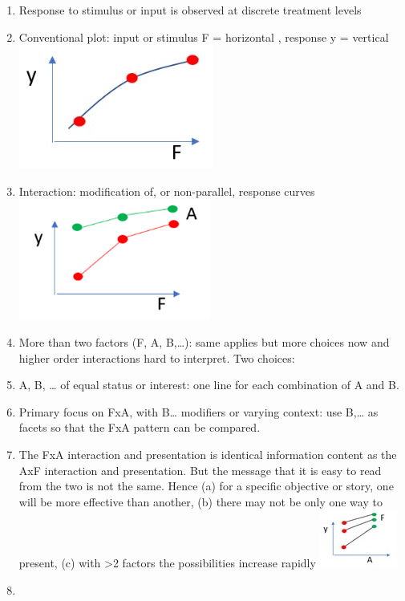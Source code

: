 \documentclass[
]{book}
\providecommand{\tightlist}{%
  \setlength{\itemsep}{0pt}\setlength{\parskip}{0pt}}
\begin{document}
\begin{enumerate}
\def\labelenumi{\arabic{enumi}.}
\tightlist
\item
  Response to stimulus or input is observed at discrete treatment levels
\item
  Conventional plot: input or stimulus F = horizontal , response y = vertical
  \includegraphics{img/Picture1.jpg}
\item
  Interaction: modification of, or non-parallel, response curves
  \includegraphics{img/Picture2.png}
\item
  More than two factors (F, A, B,\ldots): same applies but more choices now and higher order interactions hard to interpret. Two choices:
\item
  A, B, \ldots{} of equal status or interest: one line for each combination of A and B.
\item
  Primary focus on FxA, with B\ldots{} modifiers or varying context: use B,\ldots{} as facets so that the FxA pattern can be compared.
\item
  The FxA interaction and presentation is identical information content as the AxF interaction and presentation. But the message that it is easy to read from the two is not the same. Hence (a) for a specific objective or story, one will be more effective than another, (b) there may not be only one way to present, (c) with \textgreater2 factors the possibilities increase rapidly
  \includegraphics{img/Picture3.jpg}
\item

\end{enumerate}
\end{document}
